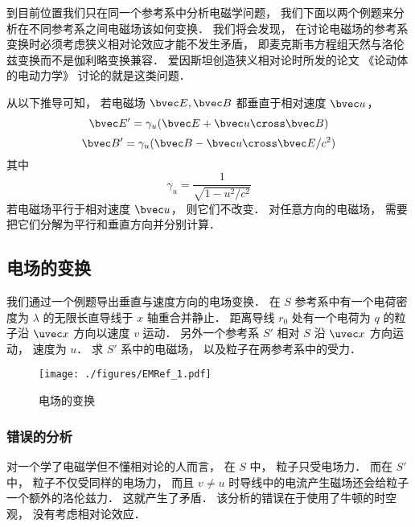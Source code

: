 
\begin{issues}
\issueTODO
{}
\end{issues}


到目前位置我们只在同一个参考系中分析电磁学问题， 我们下面以两个例题来分析在不同参考系之间电磁场该如何变换． 我们将会发现， 在讨论电磁场的参考系变换时必须考虑狭义相对论效应才能不发生矛盾， 即麦克斯韦方程组天然与洛伦兹变换而不是伽利略变换兼容． 爱因斯坦创造狭义相对论时所发的论文 《论动体的电动力学》 讨论的就是这类问题．

从以下推导可知， 若电磁场 $\bvec E, \bvec B$ 都垂直于相对速度 $\bvec u$，%
\begin{equation}\label{EMRef_eq1}
\bvec E' = \gamma_u (\bvec E + \bvec u \cross \bvec B)
\end{equation}
\begin{equation}\label{EMRef_eq2}
\bvec B' = \gamma_u (\bvec B - \bvec u \cross \bvec E/c^2)
\end{equation}
其中
\begin{equation}
\gamma_u = \frac{1}{\sqrt{1 - u^2/c^2}}
\end{equation}
若电磁场平行于相对速度 $\bvec u$， 则它们不改变． 对任意方向的电磁场， 需要把它们分解为平行和垂直方向并分别计算．

\subsection{电场的变换}
我们通过一个例题导出垂直与速度方向的电场变换． 在 $S$ 参考系中有一个电荷密度为 $\lambda$ 的无限长直导线于 $x$ 轴重合并静止． 距离导线 $r_0$ 处有一个电荷为 $q$ 的粒子沿 $\uvec x$ 方向以速度 $v$ 运动． 另外一个参考系 $S'$ 相对 $S$ 沿 $\uvec x$ 方向运动， 速度为 $u$． 求 $S'$ 系中的电磁场， 以及粒子在两参考系中的受力．
\begin{figure}[ht]
\centering
\texttt{[image: ./figures/EMRef\_1.pdf]}
\caption{电场的变换} \label{EMRef_fig1}
\end{figure}

\subsubsection{错误的分析}
对一个学了电磁学但不懂相对论的人而言， 在 $S$ 中， 粒子只受电场力． 而在 $S'$ 中， 粒子不仅受同样的电场力， 而且 $v \ne u$ 时导线中的电流产生磁场还会给粒子一个额外的洛伦兹力． 这就产生了矛盾． 该分析的错误在于使用了牛顿的时空观， 没有考虑相对论效应．

